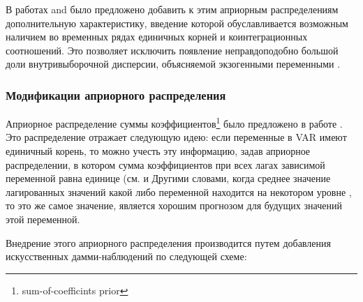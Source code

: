 \documentclass[11pt]{article} %
\newcommand{\post}{\overline}
\begin{document}


В работах \cite{doan_al_1984} and \cite{sims_1993} было предложено добавить к этим априорным распределениям дополнительную характеристику, введение которой обуславливается возможным наличием во временных рядах единичных корней и коинтеграционных  соотношений. Это позволяет исключить появление неправдоподобно большой доли внутривыборочной дисперсии, объясняемой экзогенными переменными \cite{carriero_al_2015}. %



\subsubsection*{Модификации априорного распределения}

Априорное распределение суммы коэффициентов\footnote{sum-of-coefficints prior} было предложено в работе  \cite{doan_al_1984}. Это распределение отражает следующую идею: если переменные в VAR имеют единичный корень, то можно учесть эту информацию, задав априорное распределении, в котором сумма коэффициентов при всех лагах зависимой переменной равна единице (см. \cite{robertson_tallman_1999} и \cite{blake_mumtaz_2012} Другими словами, когда среднее значение лагированных значений какой либо переменной находится на некотором уровне , то это же самое значение, является хорошим прогнозом  для будущих значений этой переменной. 



Внедрение этого априорного распределения производится путем добавления искусственных дамми-наблюдений по следующей схеме:
\end{document}
